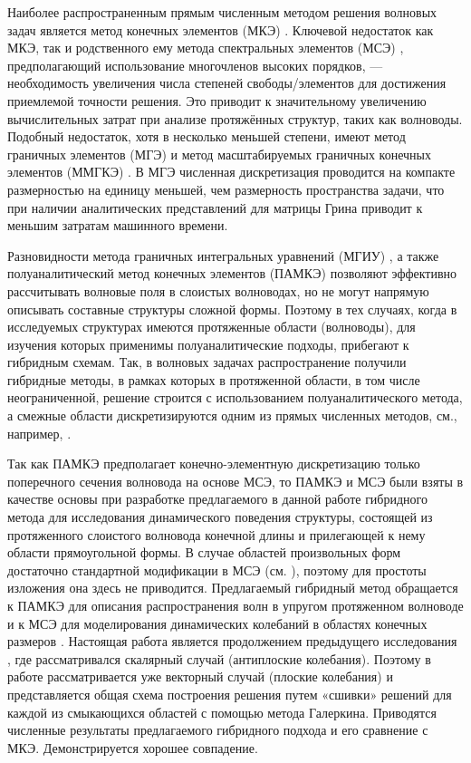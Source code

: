 \documentclass[press]{vestnik}
\begin{document}
Наиболее распространенным прямым численным методом решения волновых задач является метод конечных элементов (МКЭ) \cite{Lu}. Ключевой недостаток как МКЭ, так и родственного ему метода спектральных элементов (МСЭ) \cite{Komatitsch,Ostachowicz}, предполагающий использование многочленов высоких порядков, — необходимость увеличения числа степеней свободы/элементов для достижения приемлемой точности решения. Это приводит к значительному увеличению вычислительных затрат при анализе протяжённых структур, таких как волноводы. Подобный недостаток, хотя в несколько меньшей степени, имеют метод граничных элементов (МГЭ) \cite{Igumnov} и метод масштабируемых граничных конечных элементов (ММГКЭ) \cite{Song}. В МГЭ численная дискретизация проводится на компакте размерностью на единицу меньшей, чем размерность пространства задачи, что при наличии аналитических представлений для матрицы Грина приводит к меньшим затратам машинного времени.

Разновидности метода граничных интегральных уравнений (МГИУ) \cite{Babeshko,Vatulyan,Manolis}, а также полуаналитический метод конечных элементов (ПАМКЭ) \cite{Bartoli} позволяют эффективно рассчитывать волновые поля в слоистых волноводах, но не могут напрямую описывать составные структуры сложной формы. Поэтому в тех случаях, когда в исследуемых структурах имеются протяженные области (волноводы), для изучения которых применимы полуаналитические подходы, прибегают к гибридным схемам. Так, в волновых задачах распространение получили гибридные методы, в рамках которых в протяженной области, в том числе неограниченной, решение строится с использованием полуаналитического метода, а смежные области дискретизируются одним из прямых численных методов, см., например, \cite{Vivar-Perez,Zou,Glushkov,Golub_2019,Malik,Novikov,Vareldzhan}.

Так как ПАМКЭ предполагает конечно-элементную дискретизацию только поперечного сечения волновода на основе МСЭ, то ПАМКЭ и МСЭ были взяты в качестве основы при разработке предлагаемого в данной работе гибридного метода для исследования динамического поведения структуры, состоящей из протяженного слоистого волновода конечной длины и прилегающей к нему области прямоугольной формы. В случае областей произвольных форм достаточно стандартной модификации в МСЭ (см. \cite{Lisitsa,Bubenchikov}), поэтому для простоты изложения она здесь не приводится. Предлагаемый гибридный метод обращается к ПАМКЭ для описания распространения волн в упругом протяженном волноводе \cite{Bartoli} и к МСЭ для моделирования динамических колебаний в областях конечных размеров \cite{Shi,Bubenchikov,Golub_2015}. Настоящая работа является продолжением предыдущего исследования \cite{Khanazaryan}, где рассматривался скалярный случай (антиплоские колебания). Поэтому в работе рассматривается уже векторный случай (плоские колебания) и представляется общая схема построения решения путем «сшивки» решений для каждой из смыкающихся областей с помощью метода Галеркина. Приводятся численные результаты предлагаемого гибридного подхода и его сравнение с МКЭ. Демонстрируется хорошее совпадение.
\end{document}
